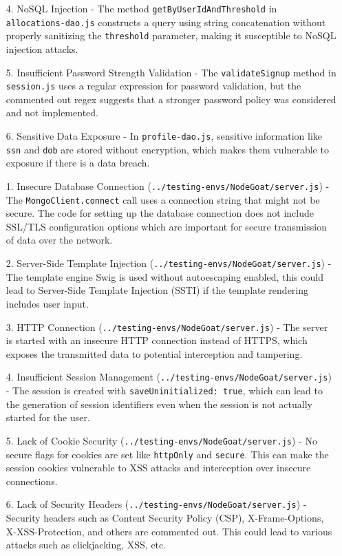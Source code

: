 \begin{enumerate}
  \item[4.] NoSQL Injection - The method \texttt{getByUserIdAndThreshold} in \texttt{allocations-dao.js} constructs a query using string concatenation without properly sanitizing the \texttt{threshold} parameter, making it susceptible to NoSQL injection attacks.
  \item[5.] Insufficient Password Strength Validation - The \texttt{validateSignup} method in \texttt{session.js} uses a regular expression for password validation, but the commented out regex suggests that a stronger password policy was considered and not implemented.
  \item[6.] Sensitive Data Exposure - In \texttt{profile-dao.js}, sensitive information like \texttt{ssn} and \texttt{dob} are stored without encryption, which makes them vulnerable to exposure if there is a data breach.
  \item[1.] Insecure Database Connection (\texttt{../testing-envs/NodeGoat/server.js}) - The \texttt{MongoClient.connect} call uses a connection string that might not be secure. The code for setting up the database connection does not include SSL/TLS configuration options which are important for secure transmission of data over the network.
  \item[2.] Server-Side Template Injection (\texttt{../testing-envs/NodeGoat/server.js}) - The template engine Swig is used without autoescaping enabled, this could lead to Server-Side Template Injection (SSTI) if the template rendering includes user input.
  \item[3.] HTTP Connection (\texttt{../testing-envs/NodeGoat/server.js}) - The server is started with an insecure HTTP connection instead of HTTPS, which exposes the transmitted data to potential interception and tampering.
  \item[4.] Insufficient Session Management (\texttt{../testing-envs/NodeGoat/server.js}) - The session is created with \texttt{saveUninitialized: true}, which can lead to the generation of session identifiers even when the session is not actually started for the user.
  \item[5.] Lack of Cookie Security (\texttt{../testing-envs/NodeGoat/server.js}) - No secure flags for cookies are set like \texttt{httpOnly} and \texttt{secure}. This can make the session cookies vulnerable to XSS attacks and interception over insecure connections.
  \item[6.] Lack of Security Headers (\texttt{../testing-envs/NodeGoat/server.js}) - Security headers such as Content Security Policy (CSP), X-Frame-Options, X-XSS-Protection, and others are commented out. This could lead to various attacks such as clickjacking, XSS, etc.

\end{enumerate}
